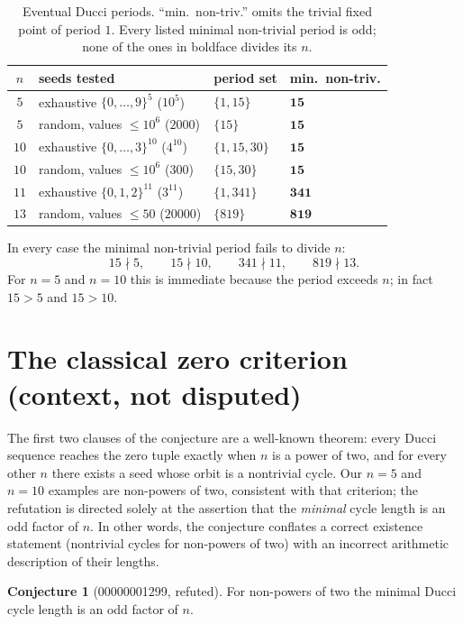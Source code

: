 \documentclass[11pt]{article}
\theoremstyle{definition}
\newtheorem{conjecture}[theorem]{Conjecture}
\begin{document}
\begin{table}[h]
\centering
\caption{Eventual Ducci periods. ``min.\ non-triv.'' omits the trivial fixed
point of period $1$. Every listed minimal non-trivial period is odd; none of the
ones in boldface divides its $n$.}
\label{tab:periods}
\begin{tabular}{clll}
\toprule
$n$ & seeds tested & period set & min.\ non-triv. \\
\midrule
$5$  & exhaustive $\{0,\dots,9\}^5$ ($10^5$) & $\{1, 15\}$ & $\mathbf{15}$ \\
$5$  & random, values $\le 10^6$ ($2000$) & $\{15\}$ & $\mathbf{15}$ \\
$10$ & exhaustive $\{0,\dots,3\}^{10}$ ($4^{10}$) & $\{1, 15, 30\}$ & $\mathbf{15}$ \\
$10$ & random, values $\le 10^6$ ($300$) & $\{15, 30\}$ & $\mathbf{15}$ \\
$11$ & exhaustive $\{0,1,2\}^{11}$ ($3^{11}$) & $\{1, 341\}$ & $\mathbf{341}$ \\
$13$ & random, values $\le 50$ ($20000$) & $\{819\}$ & $\mathbf{819}$ \\
\bottomrule
\end{tabular}
\end{table}

In every case the minimal non-trivial period fails to divide $n$:
\[
  15 \nmid 5, \qquad 15 \nmid 10, \qquad 341 \nmid 11, \qquad 819 \nmid 13 .
\]
For $n = 5$ and $n = 10$ this is immediate because the period exceeds $n$; in
fact $15 > 5$ and $15 > 10$.

\section{The classical zero criterion (context, not disputed)}

The first two clauses of the conjecture are a well-known theorem: every Ducci
sequence reaches the zero tuple exactly when $n$ is a power of two, and for
every other $n$ there exists a seed whose orbit is a nontrivial cycle. Our
$n = 5$ and $n = 10$ examples are non-powers of two, consistent with that
criterion; the refutation is directed solely at the assertion that the
\emph{minimal} cycle length is an odd factor of $n$. In other words, the
conjecture conflates a correct existence statement (nontrivial cycles for
non-powers of two) with an incorrect arithmetic description of their lengths.

\begin{conjecture}[00000001299, refuted]
For non-powers of two the minimal Ducci cycle length is an odd factor of $n$.
\end{conjecture}
\end{document}
